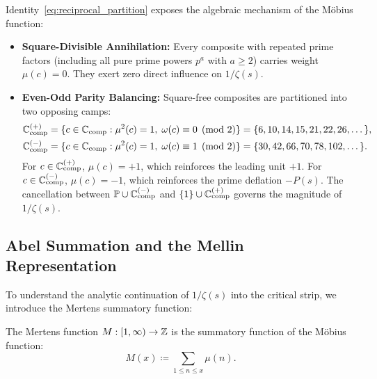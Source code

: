 \begin{remark}
Identity~\eqref{eq:reciprocal_partition} exposes the algebraic mechanism of the M\"obius function:
\begin{itemize}
  \item \textbf{Square-Divisible Annihilation:} Every composite with repeated prime factors (including all pure prime powers $p^a$ with $a \ge 2$) carries weight $\mu(c) = 0$. They exert zero direct influence on $1/\zeta(s)$.
  \item \textbf{Even-Odd Parity Balancing:} Square-free composites are partitioned into two opposing camps:
  \begin{align*}
    \mathbb{C}_{\mathrm{comp}}^{(+)} &= \{c \in \mathbb{C}_{\mathrm{comp}} : \mu^2(c) = 1, \; \omega(c) \equiv 0 \pmod 2\} = \{6, 10, 14, 15, 21, 22, 26, \dots\}, \\
    \mathbb{C}_{\mathrm{comp}}^{(-)} &= \{c \in \mathbb{C}_{\mathrm{comp}} : \mu^2(c) = 1, \; \omega(c) \equiv 1 \pmod 2\} = \{30, 42, 66, 70, 78, 102, \dots\}.
  \end{align*}
  For $c \in \mathbb{C}_{\mathrm{comp}}^{(+)}$, $\mu(c) = +1$, which reinforces the leading unit $+1$. For $c \in \mathbb{C}_{\mathrm{comp}}^{(-)}$, $\mu(c) = -1$, which reinforces the prime deflation $-P(s)$. The cancellation between $\mathbb{P} \cup \mathbb{C}_{\mathrm{comp}}^{(-)}$ and $\{1\} \cup \mathbb{C}_{\mathrm{comp}}^{(+)}$ governs the magnitude of $1/\zeta(s)$.
\end{itemize}
\end{remark}

\subsection{Abel Summation and the Mellin Representation}

To understand the analytic continuation of $1/\zeta(s)$ into the critical strip, we introduce the Mertens summatory function:

\begin{definition}
\label{def:mertens_function}
\leanok
The Mertens function $M : [1, \infty) \to \mathbb{Z}$ is the summatory function of the M\"obius function:
\begin{equation}
\label{eq:mertens_def}
M(x) \coloneqq \sum_{1 \le n \le x} \mu(n).
\end{equation}
\end{definition}

